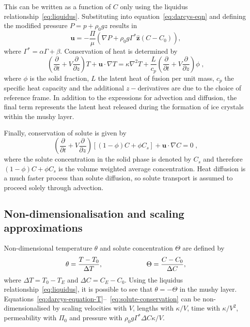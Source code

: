 \documentclass[11pt]{proc}
\begin{document}
This can be written as a function of $C$ only using the liquidus relationship~\eqref{eq:liquidus}. Substituting into equation~\eqref{eq:darcys-eqn} and defining the modified pressure $P = p + \rho_0 gz$ results in
\begin{equation}
\label{eq:darcys-equation-T}
\mathbf{u} =- \frac{\Pi}{\mu} (\nabla P + \rho_0 g \Gamma^* \mathbf{\hat{z}} (C-C_0) ),
\end{equation}
where $\Gamma^* =  \alpha \Gamma + \beta$. Conservation of heat is determined by
\begin{equation}
\label{eq:heat-conservation}
\left( \frac{\partial}{\partial t} + V\frac{\partial}{\partial z}\right) T + \mathbf{u} \cdot \nabla T = \kappa \nabla^2 T  + \frac{L}{c_p} \left( \frac{\partial}{\partial t} + V\frac{\partial}{\partial z} \right) \phi \; , 
\end{equation}
where $\phi$ is the solid fraction, $L$ the latent heat of fusion per unit mass, $c_p$ the specific heat capacity and the additional $z-$derivatives are due to the choice of reference frame. In addition to the expressions for advection and diffusion, the final term represents the latent heat released during the formation of ice crystals within the mushy layer.

Finally, conservation of solute is given by
\begin{equation}
\label{eq:solute-conservation}
\left( \frac{\partial}{\partial t} + V\frac{\partial}{\partial z}\right) \left[ (1-\phi) C + \phi C_s \right] + \mathbf{u} \cdot \nabla C =  0 \; ,
\end{equation}
where the solute concentration in the solid phase is denoted by $C_s$ and therefore $(1-\phi) C + \phi C_s$ is the volume weighted average concentration. Heat diffusion is a much faster process than solute diffusion, so solute transport is assumed to proceed solely through advection.

\subsection{Non-dimensionalisation and scaling approximations}
\label{sec:approximations}
Non-dimensional temperature $\theta$ and solute concentration $\Theta$ are defined by
\begin{equation}
\theta = \frac{T-T_0}{\Delta T}, \hspace{15ex} \Theta = \frac{C-C_0}{\Delta C},
\end{equation}
where $\Delta T = T_0 - T_E$ and $\Delta C = C_E - C_0$. Using the liquidus relationship~\eqref{eq:liquidus}, it is possible to see that $\theta = - \Theta$ in the mushy layer. Equations~\eqref{eq:darcys-equation-T}--~\eqref{eq:solute-conservation} can be non-dimensionalised by scaling velocities with $V$, lengths with $\kappa/V$, time with $\kappa/V^2$, permeability with $\Pi_0$ and pressure with $\rho_0 g \Gamma^* \Delta C \kappa / V$.
\end{document}

